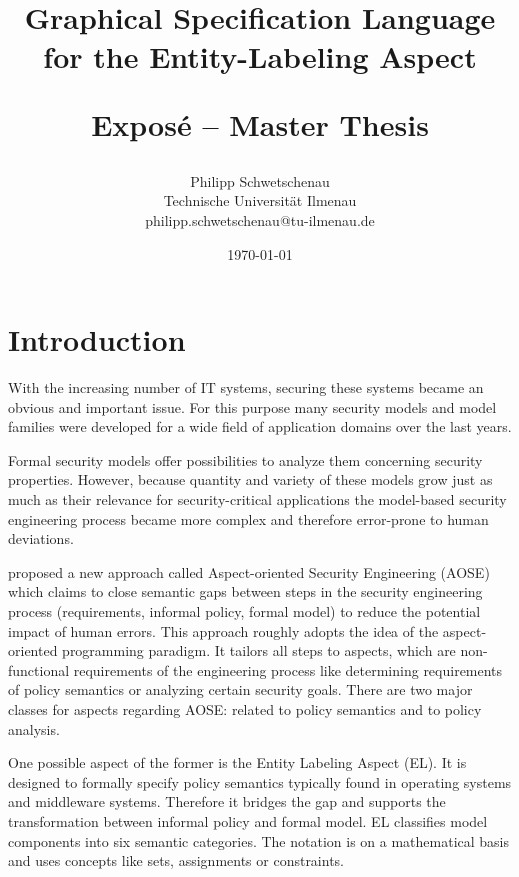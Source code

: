 \documentclass[12pt,a4paper]{article}
\begin{document}
\title{{\bf Graphical Specification Language \\for the Entity-Labeling Aspect} \\ 
\begin{large}Exposé -- Master Thesis\end{large}
}
\author{
	Philipp Schwetschenau \\
	Technische Universität Ilmenau \\
	philipp.schwetschenau@tu-ilmenau.de
}
\date{\today}

\maketitle

\section{Introduction} 
With the increasing number of IT systems, securing these systems became an obvious and important issue.
For this purpose many security models and model families were developed for a wide field of application domains over the last years.

Formal security models offer possibilities to analyze them concerning security properties.
However, because quantity and variety of these models grow just as much as their relevance for security-critical applications the model-based security engineering process became more complex and therefore error-prone to human deviations.

\citet*{Amthor18} proposed a new approach called Aspect-oriented Security Engineering (AOSE) which claims to close semantic gaps between steps in the security engineering process (requirements, informal policy, formal model) to reduce the potential impact of human errors.
This approach roughly adopts the idea of the aspect-oriented programming paradigm.
It tailors all steps to aspects, which are non-functional requirements of the engineering process like determining requirements of policy semantics or analyzing certain security goals.
There are two major classes for aspects regarding AOSE: related to policy semantics and to policy analysis.

One possible aspect of the former is the Entity Labeling Aspect (EL).
It is designed to formally specify policy semantics typically found in operating systems and middleware systems.
Therefore it bridges the gap and supports the transformation between informal policy and formal model.
EL classifies model components into six semantic categories.
The notation is on a mathematical basis and uses concepts like sets, assignments or constraints.
\end{document}
